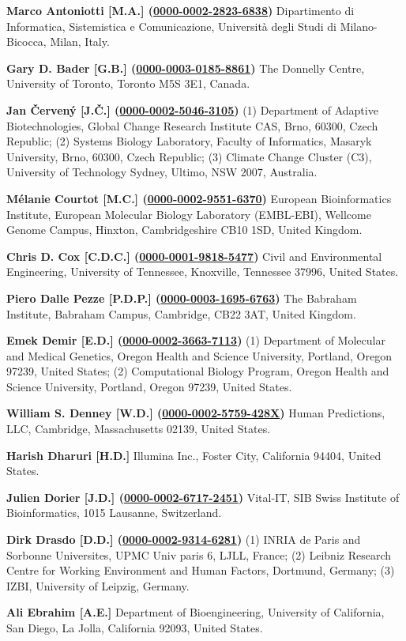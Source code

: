 \documentclass{sbml-paper}
\newcommand{\orcid}[1]{\href{https://orcid.org/#1}{#1}}
\begin{document}
\textbf{Marco Antoniotti [M.A.] (\orcid{0000-0002-2823-6838})} Dipartimento di Informatica, Sistemistica e Comunicazione, Università degli Studi di Milano-Bicocca, Milan, Italy.

\textbf{Gary D. Bader [G.B.] (\orcid{0000-0003-0185-8861})} The Donnelly Centre, University of Toronto, Toronto M5S 3E1, Canada.

\textbf{Jan Červený [J.Č.] (\orcid{0000-0002-5046-3105})} (1) Department of Adaptive Biotechnologies, Global Change Research Institute CAS, Brno, 60300, Czech Republic; (2) Systems Biology Laboratory, Faculty of Informatics, Masaryk University, Brno, 60300, Czech Republic; (3) Climate Change Cluster (C3), University of Technology Sydney, Ultimo, NSW 2007, Australia.

\textbf{Mélanie Courtot [M.C.] (\orcid{0000-0002-9551-6370})} European Bioinformatics Institute, European Molecular Biology Laboratory (EMBL-EBI), Wellcome Genome Campus, Hinxton, Cambridgeshire CB10 1SD, United Kingdom.

\textbf{Chris D. Cox [C.D.C.] (\orcid{0000-0001-9818-5477})} Civil and Environmental Engineering, University of Tennessee, Knoxville, Tennessee 37996, United States.

\textbf{Piero Dalle Pezze [P.D.P.] (\orcid{0000-0003-1695-6763})} The Babraham Institute, Babraham Campus, Cambridge, CB22 3AT, United Kingdom.

\textbf{Emek Demir [E.D.] (\orcid{0000-0002-3663-7113})} (1) Department of Molecular and Medical Genetics, Oregon Health and Science University, Portland, Oregon 97239, United States; (2) Computational Biology Program, Oregon Health and Science University, Portland, Oregon 97239, United States.

\textbf{William S. Denney [W.D.] (\orcid{0000-0002-5759-428X})} Human Predictions, LLC, Cambridge, Massachusetts 02139, United States.

\textbf{Harish Dharuri [H.D.]} Illumina Inc., Foster City, California 94404, United States.

\textbf{Julien Dorier [J.D.] (\orcid{0000-0002-6717-2451})} Vital-IT, SIB Swiss Institute of Bioinformatics, 1015 Lausanne, Switzerland.

\textbf{Dirk Drasdo [D.D.] (\orcid{0000-0002-9314-6281})} (1) INRIA de Paris and Sorbonne Universites, UPMC Univ paris 6, LJLL, France; (2) Leibniz Research Centre for Working Environment and Human Factors, Dortmund, Germany; (3) IZBI, University of Leipzig, Germany.

\textbf{Ali Ebrahim [A.E.]} Department of Bioengineering, University of California, San Diego, La Jolla, California 92093, United States.
\end{document}
